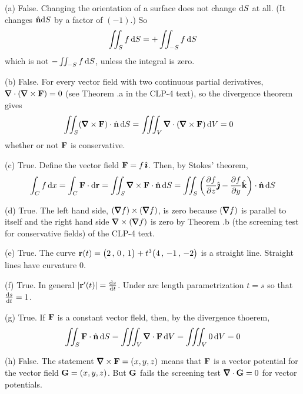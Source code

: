 \begin{solution}
(a) False. Changing the orientation of a surface does not change $\mathrm{d}S$
at all. (It changes $\hat{\mathbf{n}}\mathrm{d}S$ by a factor of $(-1)$.) So 
\begin{equation*}
\iint_S f\, \mathrm{d}S = +\iint_{-S} f\,\mathrm{d}S
\end{equation*}
which is not $-\iint_{-S} f\,\mathrm{d}S$, unless the integral is zero.

\noindent (b) False. For every vector field with two continuous
partial derivatives, $\vnabla\cdot(\vnabla\times\vF)=0$  (see Theorem
.a in the CLP-4 text), so 
the divergence theorem gives
\begin{align*}
\dblInt_S (\vnabla\times\vF) \cdot \hn\,\dee{S}
&=\tripInt_V \vnabla\cdot(\vnabla\times\vF)\,\dee{V}
=0
\end{align*}
whether or not $\mathbf{F}$ is conservative.

\noindent (c) True. Define the vector field $\mathbf{F}=f\,\hat{\pmb{\imath}}$.
Then, by Stokes' theorem,
\begin{align*}
\int_C f\,\dee{x}
=\int_C \vF\cdot\dee{\vr}
=\dblInt_S\vnabla\times\vF\cdot\hn\,\dee{S}
=\dblInt_S \left(\frac{\partial f}{\partial z}\hj
          - \frac{\partial f}{\partial y}\hk\right)\cdot\hn\,\dee{S}
\end{align*}


\noindent (d) True.
The left hand side, $(\vnabla f ) \times (\vnabla f )$, is zero
because $(\vnabla f )$ is parallel to itself and the right hand side
$\vnabla  \times (\vnabla f )$ is zero by 
Theorem .b (the screening test for
conservative fields) of the CLP-4 text.


\noindent (e) True. The curve
$\mathbf{r}(t) = \big(2 \,,\, 0\,,\, 1\big) +t^3\big(4 \,,\, -1 \,,\, -2\big)$ 
is a straight line. Straight lines have curvature $0$.

\noindent (f) True. In general $|\vr'(t)|=\diff{s}{t}$. Under arc
length parametrization $t=s$ so that $\diff{s}{t}=1$.

\noindent (g) True. If $\mathbf{F}$ is a constant vector fleld, then, by the 
divergence thoerem,
\begin{equation*}
\dblInt_S \vF \cdot \hn\,\dee{S}
=\tripInt_V \vnabla\cdot\vF\,\dee{V}
=\tripInt_V 0\,\dee{V}
=0
\end{equation*}

\noindent (h) False. The statement $\vnabla\times\vF=(x,y,z)$ means
that $\mathbf{F}$ is a vector potential for the vector field $\mathbf{G}=(x,y,z)$.
But $\mathbf{G}$ fails the screening test $\vnabla\cdot\vG=0$ for vector potentials.

\end{solution}

